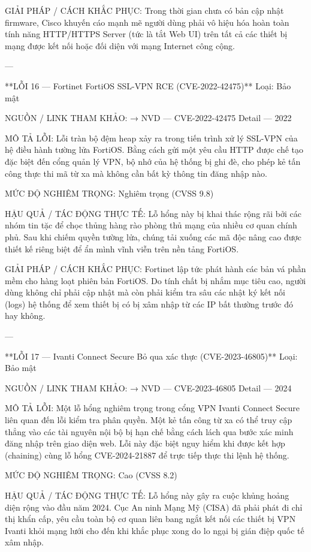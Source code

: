 GIẢI PHÁP / CÁCH KHẮC PHỤC:
Trong thời gian chưa có bản cập nhật firmware, Cisco khuyến cáo mạnh mẽ người dùng phải vô hiệu hóa hoàn toàn tính năng HTTP/HTTPS Server (tức là tắt Web UI) trên tất cả các thiết bị mạng được kết nối hoặc đối diện với mạng Internet công cộng.

---

**LỖI 16 — Fortinet FortiOS SSL-VPN RCE (CVE-2022-42475)**
Loại: Bảo mật

NGUỒN / LINK THAM KHẢO:
→ NVD — CVE-2022-42475 Detail — 2022

MÔ TẢ LỖI:
Lỗi tràn bộ đệm heap xảy ra trong tiến trình xử lý SSL-VPN của hệ điều hành tường lửa FortiOS. Bằng cách gửi một yêu cầu HTTP được chế tạo đặc biệt đến cổng quản lý VPN, bộ nhớ của hệ thống bị ghi đè, cho phép kẻ tấn công thực thi mã từ xa mà không cần bất kỳ thông tin đăng nhập nào.

MỨC ĐỘ NGHIÊM TRỌNG:
Nghiêm trọng (CVSS 9.8)

HẬU QUẢ / TÁC ĐỘNG THỰC TẾ:
Lỗ hổng này bị khai thác rộng rãi bởi các nhóm tin tặc để chọc thủng hàng rào phòng thủ mạng của nhiều cơ quan chính phủ. Sau khi chiếm quyền tường lửa, chúng tải xuống các mã độc nâng cao được thiết kế riêng biệt để ẩn mình vĩnh viễn trên nền tảng FortiOS.

GIẢI PHÁP / CÁCH KHẮC PHỤC:
Fortinet lập tức phát hành các bản vá phần mềm cho hàng loạt phiên bản FortiOS. Do tính chất bị nhắm mục tiêu cao, người dùng không chỉ phải cập nhật mà còn phải kiểm tra sâu các nhật ký kết nối (logs) hệ thống để xem thiết bị có bị xâm nhập từ các IP bất thường trước đó hay không.

---

**LỖI 17 — Ivanti Connect Secure Bỏ qua xác thực (CVE-2023-46805)**
Loại: Bảo mật

NGUỒN / LINK THAM KHẢO:
→ NVD — CVE-2023-46805 Detail — 2024

MÔ TẢ LỖI:
Một lỗ hổng nghiêm trọng trong cổng VPN Ivanti Connect Secure liên quan đến lỗi kiểm tra phân quyền. Một kẻ tấn công từ xa có thể truy cập thẳng vào các tài nguyên nội bộ bị hạn chế bằng cách lách qua bước xác minh đăng nhập trên giao diện web. Lỗi này đặc biệt nguy hiểm khi được kết hợp (chaining) cùng lỗ hổng CVE-2024-21887 để trực tiếp thực thi lệnh hệ thống.

MỨC ĐỘ NGHIÊM TRỌNG:
Cao (CVSS 8.2)

HẬU QUẢ / TÁC ĐỘNG THỰC TẾ:
Lỗ hổng này gây ra cuộc khủng hoảng diện rộng vào đầu năm 2024. Cục An ninh Mạng Mỹ (CISA) đã phải phát đi chỉ thị khẩn cấp, yêu cầu toàn bộ cơ quan liên bang ngắt kết nối các thiết bị VPN Ivanti khỏi mạng lưới cho đến khi khắc phục xong do lo ngại bị gián điệp quốc tế xâm nhập.


